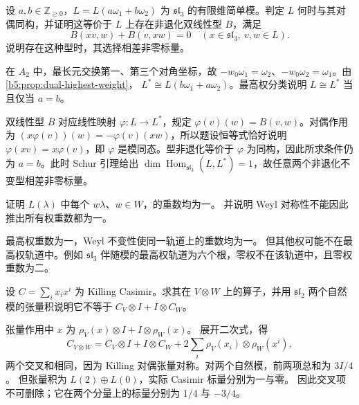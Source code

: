 \begin{exercise}\label{b5:ex:19-dual-highest}
	设 \(a,b\in\mathbb Z_{\ge0}\)，\(L=L(a\omega_1+b\omega_2)\) 为 \(\mathfrak{sl}_3\) 的有限维简单模。判定 \(L\) 何时与其对偶同构，并证明这等价于 \(L\) 上存在非退化双线性型 \(B\)，满足
	\[
		B(xv,w)+B(v,xw)=0 \quad(x\in\mathfrak{sl}_3,\ v,w\in L).
	\]
	说明存在这种型时，其选择相差非零标量。
\end{exercise}
\begin{solution}
	在 \(A_2\) 中，最长元交换第一、第三个对角坐标，故 \(-w_0\omega_1=\omega_2\)、\(-w_0\omega_2=\omega_1\)。由\cref{b5:prop:dual-highest-weight}， \(L^*\cong L(b\omega_1+a\omega_2)\)。最高权分类说明 \(L\cong L^*\) 当且仅当 \(a=b\)。

	双线性型 \(B\) 对应线性映射 \(\varphi:L\to L^*\)，规定 \(\varphi(v)(w)=B(v,w)\)。对偶作用为 \((x\varphi(v))(w)=-\varphi(v)(xw)\)，所以题设恒等式恰好说明 \(\varphi(xv)=x\varphi(v)\)，即 \(\varphi\) 是模同态。型非退化等价于 \(\varphi\) 为同构，因此所求条件仍为 \(a=b\)。此时 Schur 引理给出 \(\dim\operatorname{Hom}_{\mathfrak{sl}_3}(L,L^*)=1\)，故任意两个非退化不变型相差非零标量。
\end{solution}

\begin{exercise}\label{b5:ex:19-extremal-multiplicity}
	证明 \(L(\lambda)\) 中每个 \(w\lambda\)、\(w\in W\)，的重数均为一。 并说明 Weyl 对称性不能因此推出所有权重数都为一。
\end{exercise}
\begin{solution}
	最高权重数为一，Weyl 不变性使同一轨道上的重数均为一。 但其他权可能不在最高权轨道中。例如 \(\mathfrak{sl}_3\) 伴随模的最高权轨道为六个根，零权不在该轨道中，且零权重数为二。
\end{solution}

\begin{exercise}\label{b5:ex:19-casimir-tensor-cross-term}
	设 \(C=\sum_i x_ix^i\) 为 Killing Casimir。求其在 \(V\otimes W\) 上的算子，并用 \(\mathfrak{sl}_2\) 两个自然模的张量积说明它不等于 \(C_V\otimes I+I\otimes C_W\)。
\end{exercise}
\begin{solution}
	张量作用中 \(x\) 为 \(\rho_V(x)\otimes I+I\otimes\rho_W(x)\)。 展开二次式，得
	\[
		C_{V\otimes W}=C_V\otimes I+I\otimes C_W +2\sum_i\rho_V(x_i)\otimes\rho_W(x^i),
	\]
	两个交叉和相同，因为 Killing 对偶张量对称。对两个自然模，前两项总和为 \(3I/4\)。 但张量积为 \(L(2)\oplus L(0)\)，实际 Casimir 标量分别为一与零。 因此交叉项不可删除；它在两个分量上的标量分别为 \(1/4\) 与 \(-3/4\)。
\end{solution}

